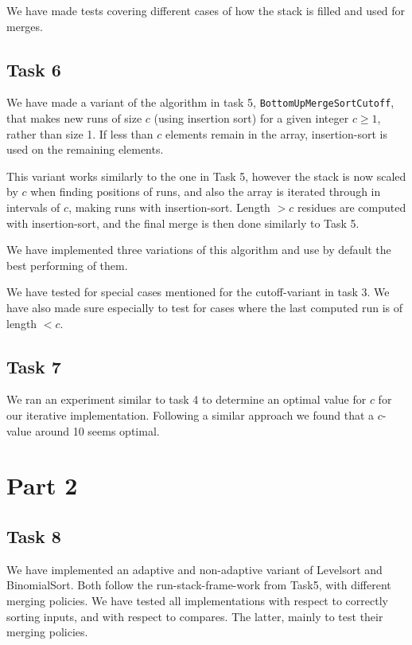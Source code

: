 \documentclass[11pt, a4paper]{article}
\begin{document}
 We have made tests covering different cases of how the stack is filled and used for merges.

\subsection{Task 6}

We have made a variant of the algorithm in task 5, \verb|BottomUpMergeSortCutoff|, that makes new runs of size $c$ (using insertion sort) for a given integer $c\geq1$, rather than size 1. If less than $c$ elements remain in the array, insertion-sort is used on the remaining elements. 

This variant works similarly to the one in Task 5, however the stack is now scaled by $c$ when finding positions of runs, and also the array is iterated through in intervals of $c$, making runs with insertion-sort. Length $>c$ residues are computed with insertion-sort, and the final merge is then done similarly to Task 5.

We have implemented three variations of this algorithm and use by default the best performing of them. 

We have tested for special cases mentioned for the cutoff-variant in task 3. We have also made sure especially to test for cases where the last computed run is of length $<c$. 

\subsection{Task 7}

We ran an experiment similar to task 4 to determine an optimal value for $c$ for our iterative implementation. Following a similar approach we found that a $c$-value around 10 seems optimal.

\section{Part 2}

\subsection{Task 8}

We have implemented an adaptive and non-adaptive variant of Levelsort and BinomialSort. Both follow the run-stack-frame-work from Task5, with different merging policies. We have tested all implementations with respect to correctly sorting inputs, and with respect to compares. The latter, mainly to test their merging policies.
\end{document}
